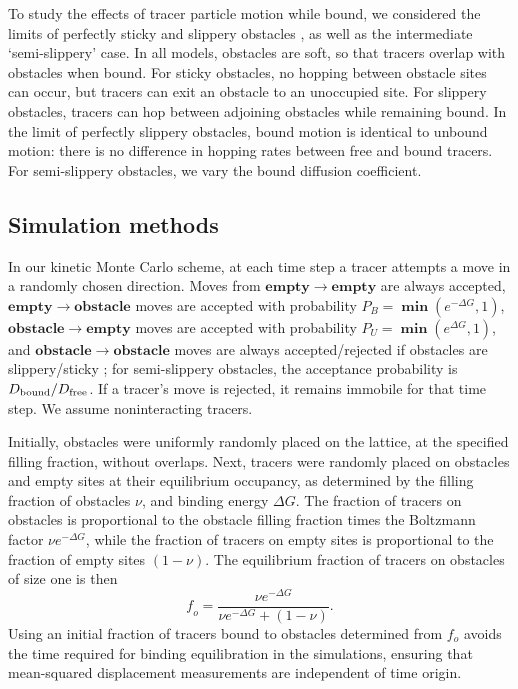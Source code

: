 To study the effects of tracer particle motion while bound, we considered the
limits of perfectly sticky and slippery obstacles , as
well as the intermediate `semi-slippery' case. In all models, obstacles are
soft, so that tracers overlap with obstacles when bound. For sticky obstacles,
no hopping between obstacle sites can occur, but tracers can exit an obstacle to
an unoccupied site.  For slippery obstacles, tracers can hop between adjoining
obstacles while remaining bound.  In the limit of perfectly slippery obstacles,
bound motion is identical to unbound motion: there is no difference in hopping
rates between free and bound tracers. For semi-slippery obstacles, we vary the
bound diffusion coefficient.

\subsection{Simulation methods}

In our kinetic Monte Carlo scheme, at each time step a tracer attempts a move in
a randomly chosen direction. Moves from $ \mathbf {empty} \rightarrow \mathbf
{empty} $ are always accepted, $ \mathbf {empty} \rightarrow \mathbf {obstacle}$
moves are accepted with probability $ P_B = \mathbf {\min}( e^{-\Delta G}, 1) $,
$ \mathbf {obstacle} \rightarrow \mathbf {empty} $ moves are accepted with
probability $ P_U = \mathbf {\min}( e^{\Delta G}, 1 ) $, and $ \mathbf
{obstacle} \rightarrow \mathbf {obstacle} $ moves are always accepted/rejected
if obstacles are slippery/sticky ; for semi-slippery
obstacles, the acceptance probability is $D_{\rm bound}/D_{\rm free}$. If a
tracer's move is rejected, it remains immobile for that time step. We assume
noninteracting tracers.

Initially, obstacles were uniformly randomly placed on the lattice, at the
specified filling fraction, without overlaps. Next, tracers were randomly placed
on obstacles and empty sites at their equilibrium occupancy, as determined by
the filling fraction of obstacles $\nu$, and binding energy $\Delta G$.  The
fraction of tracers on obstacles is proportional to the obstacle filling
fraction times the Boltzmann factor $\nu e^{-\Delta G}$, while the fraction of
tracers on empty sites is proportional to the fraction of empty sites $(1-\nu)$.
The equilibrium fraction of tracers on obstacles of size one is then
%
\begin{equation}
  \mathit{f}_{o} = 
    \frac{\nu e^{-\Delta G}}{\nu e^{-\Delta G} + \left(1 - \nu \right)}.
\end{equation}
%
Using an initial fraction of tracers bound to obstacles determined from $f_o$
avoids the time required for binding equilibration in the simulations, ensuring
that mean-squared displacement measurements are independent of time origin.

